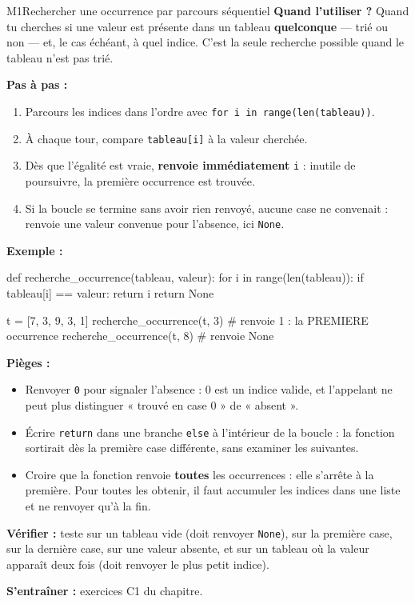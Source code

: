 \begin{fichemethode}{M1}{Rechercher une occurrence par parcours séquentiel}
\textbf{Quand l'utiliser ?} Quand tu cherches si une valeur est présente dans un tableau
\textbf{quelconque} — trié ou non — et, le cas échéant, à quel indice. C'est la seule
recherche possible quand le tableau n'est pas trié.

\textbf{Pas à pas :}
\begin{enumerate}
  \item Parcours les indices dans l'ordre avec \lstinline{for i in range(len(tableau))}.
  \item À chaque tour, compare \lstinline{tableau[i]} à la valeur cherchée.
  \item Dès que l'égalité est vraie, \textbf{renvoie immédiatement} \lstinline{i} : inutile de
    poursuivre, la première occurrence est trouvée.
  \item Si la boucle se termine sans avoir rien renvoyé, aucune case ne convenait :
    renvoie une valeur convenue pour l'absence, ici \lstinline{None}.
\end{enumerate}

\textbf{Exemple :}
\begin{python}
def recherche_occurrence(tableau, valeur):
    for i in range(len(tableau)):
        if tableau[i] == valeur:
            return i
    return None

t = [7, 3, 9, 3, 1]
recherche_occurrence(t, 3)    # renvoie 1 : la PREMIERE occurrence
recherche_occurrence(t, 8)    # renvoie None
\end{python}

\textbf{Pièges :}
\begin{itemize}
  \item Renvoyer \lstinline{0} pour signaler l'absence : $0$ est un indice valide, et
    l'appelant ne peut plus distinguer « trouvé en case $0$ » de « absent ».
  \item Écrire \lstinline{return} dans une branche \lstinline{else} à l'intérieur de la
    boucle : la fonction sortirait dès la première case différente, sans examiner les
    suivantes.
  \item Croire que la fonction renvoie \textbf{toutes} les occurrences : elle s'arrête à la
    première. Pour toutes les obtenir, il faut accumuler les indices dans une liste et ne
    renvoyer qu'à la fin.
\end{itemize}

\textbf{Vérifier :} teste sur un tableau vide (doit renvoyer \lstinline{None}), sur la
première case, sur la dernière case, sur une valeur absente, et sur un tableau où la valeur
apparaît deux fois (doit renvoyer le plus petit indice).

\textbf{S'entraîner :} exercices C1 du chapitre.
\end{fichemethode}
